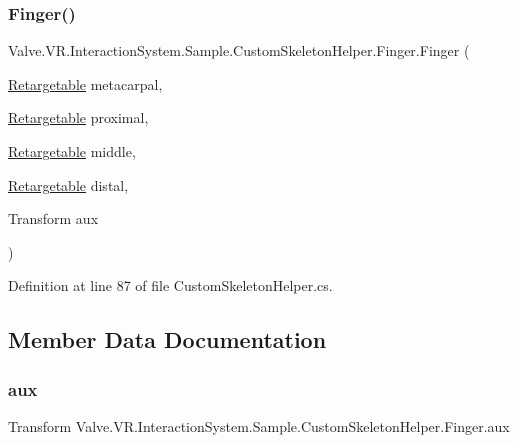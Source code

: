 \subsubsection{\texorpdfstring{Finger()}{Finger()}}
{\footnotesize\ttfamily Valve.\+V\+R.\+Interaction\+System.\+Sample.\+Custom\+Skeleton\+Helper.\+Finger.\+Finger (\begin{DoxyParamCaption}\item[{\mbox{\hyperlink{class_valve_1_1_v_r_1_1_interaction_system_1_1_sample_1_1_custom_skeleton_helper_1_1_retargetable}{Retargetable}}}]{metacarpal,  }\item[{\mbox{\hyperlink{class_valve_1_1_v_r_1_1_interaction_system_1_1_sample_1_1_custom_skeleton_helper_1_1_retargetable}{Retargetable}}}]{proximal,  }\item[{\mbox{\hyperlink{class_valve_1_1_v_r_1_1_interaction_system_1_1_sample_1_1_custom_skeleton_helper_1_1_retargetable}{Retargetable}}}]{middle,  }\item[{\mbox{\hyperlink{class_valve_1_1_v_r_1_1_interaction_system_1_1_sample_1_1_custom_skeleton_helper_1_1_retargetable}{Retargetable}}}]{distal,  }\item[{Transform}]{aux }\end{DoxyParamCaption})}



Definition at line 87 of file Custom\+Skeleton\+Helper.\+cs.



\subsection{Member Data Documentation}
\mbox{\label{class_valve_1_1_v_r_1_1_interaction_system_1_1_sample_1_1_custom_skeleton_helper_1_1_finger_a2bdd542921c2e05451277a00e0f8471e}} 
\subsubsection{\texorpdfstring{aux}{aux}}
{\footnotesize\ttfamily Transform Valve.\+V\+R.\+Interaction\+System.\+Sample.\+Custom\+Skeleton\+Helper.\+Finger.\+aux}



